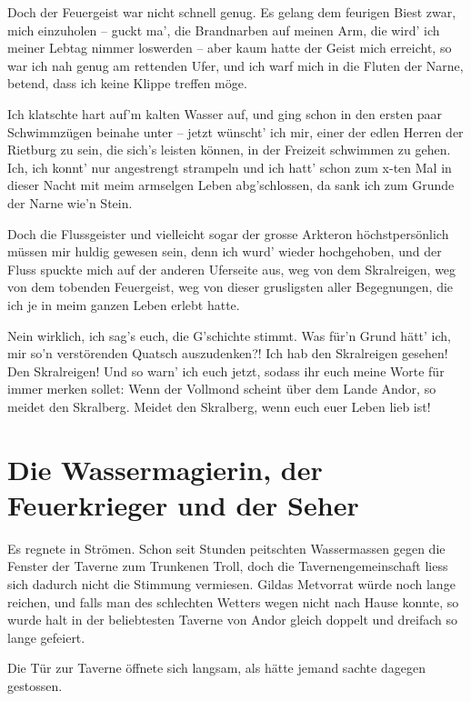 Doch der Feuergeist war nicht schnell genug. Es gelang dem feurigen Biest zwar, mich einzuholen – guckt ma’, die Brandnarben auf meinen Arm, die wird’ ich meiner Lebtag nimmer loswerden – aber kaum hatte der Geist mich erreicht, so war ich nah genug am rettenden Ufer, und ich warf mich in die Fluten der Narne, betend, dass ich keine Klippe treffen möge.

Ich klatschte hart auf’m kalten Wasser auf, und ging schon in den ersten paar Schwimmzügen beinahe unter – jetzt wünscht’ ich mir, einer der edlen Herren der Rietburg zu sein, die sich’s leisten können, in der Freizeit schwimmen zu gehen. Ich, ich konnt’ nur angestrengt strampeln und ich hatt’ schon zum x-ten Mal in dieser Nacht mit meim armselgen Leben abg’schlossen, da sank ich zum Grunde der Narne wie’n Stein.

Doch die Flussgeister und vielleicht sogar der grosse Arkteron höchstpersönlich müssen mir huldig gewesen sein, denn ich wurd’ wieder hochgehoben, und der Fluss spuckte mich auf der anderen Uferseite aus, weg von dem Skralreigen, weg von dem tobenden Feuergeist, weg von dieser grusligsten aller Begegnungen, die ich je in meim ganzen Leben erlebt hatte.

Nein wirklich, ich sag’s euch, die G’schichte stimmt. Was für’n Grund hätt’ ich, mir so’n verstörenden Quatsch auszudenken?! Ich hab den Skralreigen gesehen! Den Skralreigen! Und so warn’ ich euch jetzt, sodass ihr euch meine Worte für immer merken sollet: Wenn der Vollmond scheint über dem Lande Andor, so meidet den Skralberg. Meidet den Skralberg, wenn euch euer Leben lieb ist!






\newpage
\section{Die Wassermagierin, der Feuerkrieger und der Seher}



Es regnete in Strömen. Schon seit Stunden peitschten Wassermassen gegen die Fenster der Taverne zum Trunkenen Troll, doch die Tavernengemeinschaft liess sich dadurch nicht die Stimmung vermiesen. Gildas Metvorrat würde noch lange reichen, und falls man des schlechten Wetters wegen nicht nach Hause konnte, so wurde halt in der beliebtesten Taverne von Andor gleich doppelt und dreifach so lange gefeiert.

Die Tür zur Taverne öffnete sich langsam, als hätte jemand sachte dagegen gestossen.

